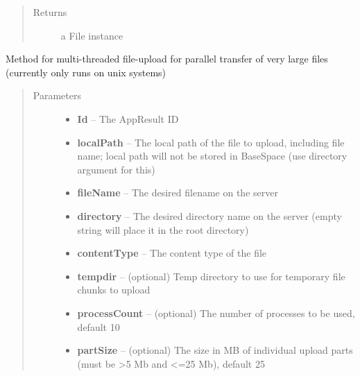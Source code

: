 \documentclass[letterpaper,10pt,english]{sphinxmanual}
\begin{document}
\begin{fulllineitems}
\begin{fulllineitems}
\begin{quote}
\begin{description}
\item[{Returns}] \leavevmode
a File instance

\end{description}\end{quote}

\end{fulllineitems}


\begin{fulllineitems}
\label{Available modules:BaseSpacePy.api.BaseSpaceAPI.BaseSpaceAPI.multipartFileUpload}
Method for multi-threaded file-upload for parallel transfer of very large files (currently only runs on unix systems)
\begin{quote}\begin{description}
\item[{Parameters}] \leavevmode\begin{itemize}
\item {} 
\textbf{Id} -- The AppResult ID

\item {} 
\textbf{localPath} -- The local path of the file to upload, including file name; local path will not be stored in BaseSpace (use directory argument for this)

\item {} 
\textbf{fileName} -- The desired filename on the server

\item {} 
\textbf{directory} -- The desired directory name on the server (empty string will place it in the root directory)

\item {} 
\textbf{contentType} -- The content type of the file

\item {} 
\textbf{tempdir} -- (optional) Temp directory to use for temporary file chunks to upload

\item {} 
\textbf{processCount} -- (optional) The number of processes to be used, default 10

\item {} 
\textbf{partSize} -- (optional) The size in MB of individual upload parts (must be \textgreater{}5 Mb and \textless{}=25 Mb), default 25


\end{itemize}
\end{description}
\end{quote}
\end{fulllineitems}
\end{fulllineitems}
\end{document}
